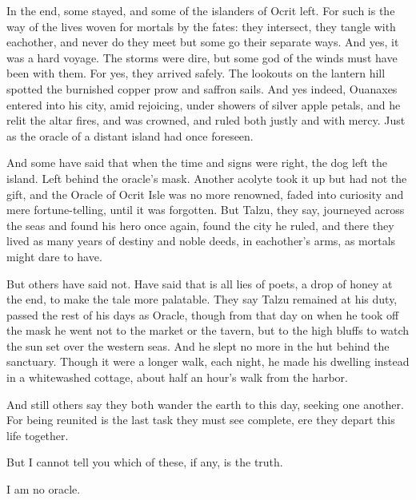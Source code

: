 In the end, some stayed, and some of the islanders of Ocrit left. For such is the way of the lives woven for mortals by the fates: they intersect, they tangle with eachother, and never do they meet but some go their separate ways. And yes, it was a hard voyage. The storms were dire, but some god of the winds must have been with them. For yes, they arrived safely. The lookouts on the lantern hill spotted the burnished copper prow and saffron sails. And yes indeed, Ouanaxes entered into his city, amid rejoicing, under showers of silver apple petals, and he relit the altar fires, and was crowned, and ruled both justly and with mercy. Just as the oracle of a distant island had once foreseen.

\secdiv

And some have said that when the time and signs were right, the dog left the island. Left behind the oracle's mask. Another acolyte took it up but had not the gift, and the Oracle of Ocrit Isle was no more renowned, faded into curiosity and mere fortune-telling, until it was forgotten. But Talzu, they say, journeyed across the seas and found his hero once again, found the city he ruled, and there they lived as many years of destiny and noble deeds, in eachother's arms, as mortals might dare to have.

But others have said not. Have said that is all lies of poets, a drop of honey at the end, to make the tale more palatable. They say Talzu remained at his duty, passed the rest of his days as Oracle, though from that day on when he took off the mask he went not to the market or the tavern, but to the high bluffs to watch the sun set over the western seas. And he slept no more in the hut behind the sanctuary. Though it were a longer walk, each night, he made his dwelling instead in a whitewashed cottage, about half an hour's walk from the harbor.

And still others say they both wander the earth to this day, seeking one another. For being reunited is the last task they must see complete, ere they depart this life together.

But I cannot tell you which of these, if any, is the truth.

I am no oracle.
